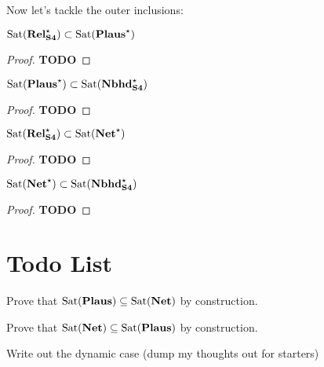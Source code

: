 \documentclass[letterpaper]{article}
\begin{document}
Now let's tackle the outer inclusions:
\begin{proposition}
    $\mathrm{Sat}( \textrm{\textbf{Rel}}_\textrm{\textbf{S4}}^\star ) \subset \mathrm{Sat}( \textrm{\textbf{Plaus}}^\star )$
\end{proposition}
\begin{proof}
    \textbf{TODO}
\end{proof}

\begin{proposition}
    $\mathrm{Sat}( \textrm{\textbf{Plaus}}^\star ) \subset \mathrm{Sat}( \textrm{\textbf{Nbhd}}_\textrm{\textbf{S4}}^\star )$
\end{proposition}
\begin{proof}
    \textbf{TODO}
\end{proof}

\begin{proposition}
    $\mathrm{Sat}( \textrm{\textbf{Rel}}_\textrm{\textbf{S4}}^\star ) \subset \mathrm{Sat}( \textrm{\textbf{Net}}^\star )$
\end{proposition}
\begin{proof}
    \textbf{TODO}
\end{proof}

\begin{proposition}
    $\mathrm{Sat}( \textrm{\textbf{Net}}^\star ) \subset \mathrm{Sat}( \textrm{\textbf{Nbhd}}_\textrm{\textbf{S4}}^\star )$
\end{proposition}
\begin{proof}
    \textbf{TODO}
\end{proof}



\section*{Todo List}
\begin{todolist}
    \item Prove that $\mathrm{Sat}( \textrm{\textbf{Plaus}} ) \subseteq \mathrm{Sat}( \textrm{\textbf{Net}} )$ by construction.
    \item Prove that $\mathrm{Sat}( \textrm{\textbf{Net}} ) \subseteq \mathrm{Sat}( \textrm{\textbf{Plaus}} )$ by construction.
    \item Write out the dynamic case (dump my thoughts out for starters)
\end{todolist}

\end{document}
